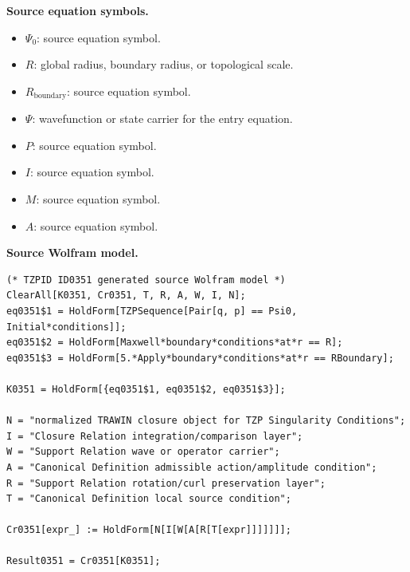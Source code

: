 \begin{minipage}[t]{0.49\linewidth}
\begingroup
\small
\raggedright
\textbf{Source equation symbols.}\par
\begin{itemize}[leftmargin=1.35em,itemsep=1pt,topsep=1pt,parsep=0pt]
    \item $\Psi_0$: source equation symbol.
    \item $R$: global radius, boundary radius, or topological scale.
    \item $R_{\mathrm{boundary}}$: source equation symbol.
    \item $\Psi$: wavefunction or state carrier for the entry equation.
    \item $P$: source equation symbol.
    \item $I$: source equation symbol.
    \item $M$: source equation symbol.
    \item $A$: source equation symbol.
\end{itemize}
\endgroup
\end{minipage}\hfill
\begin{minipage}[t]{0.47\linewidth}
\begingroup
\scriptsize
\raggedright
\textbf{Source Wolfram model.}\par
\begin{Verbatim}[fontsize=\tiny,breaklines=true,breakanywhere=true]
(* TZPID ID0351 generated source Wolfram model *)
ClearAll[K0351, Cr0351, T, R, A, W, I, N];
eq0351$1 = HoldForm[TZPSequence[Pair[q, p] == Psi0, Initial*conditions]];
eq0351$2 = HoldForm[Maxwell*boundary*conditions*at*r == R];
eq0351$3 = HoldForm[5.*Apply*boundary*conditions*at*r == RBoundary];

K0351 = HoldForm[{eq0351$1, eq0351$2, eq0351$3}];

N = "normalized TRAWIN closure object for TZP Singularity Conditions";
I = "Closure Relation integration/comparison layer";
W = "Support Relation wave or operator carrier";
A = "Canonical Definition admissible action/amplitude condition";
R = "Support Relation rotation/curl preservation layer";
T = "Canonical Definition local source condition";

Cr0351[expr_] := HoldForm[N[I[W[A[R[T[expr]]]]]]];

Result0351 = Cr0351[K0351];
\end{Verbatim}
\endgroup
\end{minipage}

